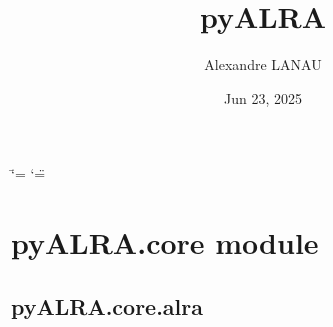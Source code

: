 \documentclass[letterpaper,10pt,english]{sphinxmanual}
\title{pyALRA}
\date{Jun 23, 2025}
\author{Alexandre LANAU}
\begin{document}
\ifdefined\shorthandoff
  \ifnum\catcode`\=\string=\active\shorthandoff{=}\fi
  \ifnum\catcode`\"=\active{}\fi
\fi

\pagestyle{empty}
\sphinxmaketitle
\pagestyle{plain}
\sphinxtableofcontents
\pagestyle{normal}
\label{\detokenize{index::doc}}


\sphinxstepscope


\chapter{pyALRA.core module}
\label{\detokenize{core:pyalra-core-module}}\label{\detokenize{core::doc}}

\section{pyALRA.core.alra}
\label{\detokenize{core:pyalra-core-alra}}
\end{document}
